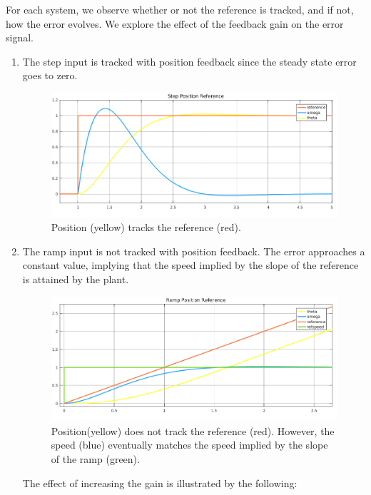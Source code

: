 \documentclass[11pt,a4paper]{article}
\begin{document}
For each system, we observe whether or not the reference is tracked, and if not, how the error evolves. We explore the effect of the feedback gain on the error signal.
\begin{enumerate}
	\item The step input is tracked with position feedback since the steady state error goes to zero.
	
	\begin{figure}[!htbp]
	\includegraphics[width=\textwidth]{imglab/lab4sol_steppostraj.png}
	\caption{Position (yellow) tracks the reference (red).}
	\end{figure}
	
	\item The ramp input is not tracked with position feedback. The error approaches a constant value, implying that the speed implied by the slope of the reference is attained by the plant.

	\begin{figure}[!htbp]
	\includegraphics[width=\textwidth]{imglab/lab4sol_ramppostraj.png}
	\caption{Position(yellow) does not track the reference (red). However, the speed (blue) eventually matches the speed implied by the slope of the ramp (green). }
	\end{figure}	
	
	The effect of increasing the gain is illustrated by the following:
	

\end{enumerate}
\end{document}

